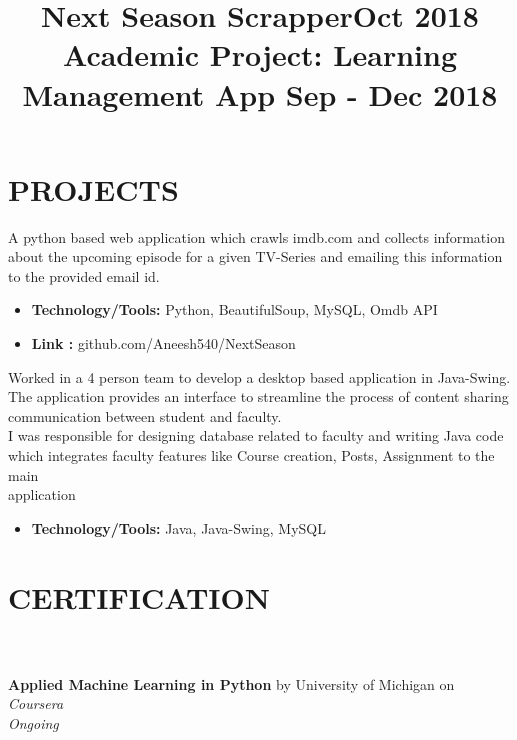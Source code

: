 \documentclass[margin]{res}
\begin{document}
\begin{resume}
\section{PROJECTS}
\location{}
\title{\textbf{Next Season Scrapper\hfill Oct 2018}
 }
\begin{position}
A python based web application which crawls imdb.com and collects information about the upcoming episode for a given TV-Series and emailing this information to the provided email id.  
\begin{itemize}
\item \textbf{Technology/Tools:} Python, BeautifulSoup, MySQL, Omdb API
\end{itemize}
\begin{itemize}
\item \textbf{Link :} github.com/Aneesh540/NextSeason
\end{itemize}
\end{position}

\location{}
\title{\textbf{Academic Project: Learning Management App \hfill Sep - Dec 2018}
 }
\begin{position}
Worked in a 4 person team to develop a desktop based application in Java-Swing. The application provides an interface to streamline the process of content sharing communication between student and faculty.\\
I was responsible for designing database related to faculty and writing Java code which integrates faculty features like Course creation, Posts, Assignment to the main \\application
\begin{itemize}
\item \textbf{Technology/Tools:} Java, Java-Swing, MySQL 
\end{itemize}
\end{position}


\section{CERTIFICATION}
\par
{}
\\
\\
\textbullet{} \textbf{Applied Machine Learning in Python} by University of Michigan on \sl{Coursera} \\ Ongoing



\end{resume}
\end{document}
